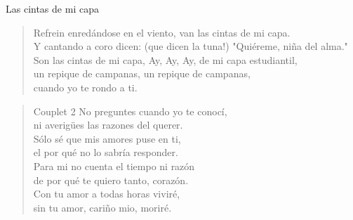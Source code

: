 \begin{song}{Las cintas de mi capa}
\begin{verse}{Refrein}
enredándose en el viento, van las cintas de mi capa.\\
Y cantando a coro dicen: (que dicen la tuna!) "Quiéreme, niña del alma."\\
Son las cintas de mi capa, Ay, Ay, Ay, de mi capa estudiantil,\\
un repique de campanas, un repique de campanas, \hspace{1em}\\
\hspace{2em} cuando yo te rondo a ti. \hspace{1em} \hspace{2em} 
\end{verse}
\begin{verse}{Couplet 2}
No preguntes cuando yo te conocí,\\
ni averigües las razones del querer.\\
Sólo sé que mis amores puse en ti,\\
el por qué no lo sabría responder.\\
Para mi no cuenta el tiempo ni razón\\
de por qué te quiero tanto, corazón.\\
Con tu amor a todas horas viviré,\\
sin tu amor, cariño mio, moriré. \hspace{2em}  \hspace{2.5em} \hspace{1em} 
\end{verse}
\end{song}

